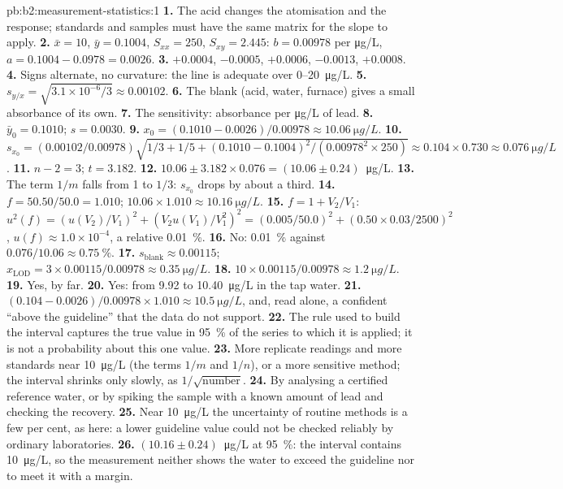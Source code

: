 \begin{solution}{pb:b2:measurement-statistics:1}
\textbf{1.} The acid changes the atomisation and the response; standards and samples must have the same
matrix for the slope to apply.
\textbf{2.} $\bar x = 10$, $\bar y = 0.1004$, $S_{xx} = 250$, $S_{xy} = 2.445$: $b = 0.00978$ per
\unit{\micro g/L}, $a = 0.1004 - 0.0978 = 0.0026$.
\textbf{3.} $+0.0004$, $-0.0005$, $+0.0006$, $-0.0013$, $+0.0008$.
\textbf{4.} Signs alternate, no curvature: the line is adequate over 0--\qty{20}{\micro g/L}.
\textbf{5.} $s_{y/x} = \sqrt{3.1 \times 10^{-6}/3} \approx 0.00102$.
\textbf{6.} The blank (acid, water, furnace) gives a small absorbance of its own.
\textbf{7.} The sensitivity: absorbance per \unit{\micro g/L} of lead.
\textbf{8.} $\bar y_0 = 0.1010$; $s = 0.0030$.
\textbf{9.} $x_0 = (0.1010 - 0.0026)/0.00978 \approx \qty{10.06}{\micro g/L}$.
\textbf{10.} $s_{x_0} = (0.00102/0.00978)\sqrt{1/3 + 1/5 + (0.1010 - 0.1004)^2/(0.00978^2 \times 250)}
\approx 0.104 \times 0.730 \approx \qty{0.076}{\micro g/L}$.
\textbf{11.} $n - 2 = 3$; $t = 3.182$.
\textbf{12.} $10.06 \pm 3.182 \times 0.076 = (10.06 \pm 0.24)$~\unit{\micro g/L}.
\textbf{13.} The term $1/m$ falls from 1 to $1/3$: $s_{x_0}$ drops by about a third.
\textbf{14.} $f = 50.50/50.0 = 1.010$; $10.06 \times 1.010 \approx \qty{10.16}{\micro g/L}$.
\textbf{15.} $f = 1 + V_2/V_1$: $u^2(f) = (u(V_2)/V_1)^2 + (V_2u(V_1)/V_1^2)^2 = (0.005/50.0)^2 +
(0.50 \times 0.03/2500)^2$, $u(f) \approx 1.0 \times 10^{-4}$, a relative 0.01~\%.
\textbf{16.} No: 0.01~\% against $0.076/10.06 \approx 0.75~\%$.
\textbf{17.} $s_{\mathrm{blank}} \approx 0.00115$; $x_{\mathrm{LOD}} = 3 \times 0.00115/0.00978 \approx
\qty{0.35}{\micro g/L}$.
\textbf{18.} $10 \times 0.00115/0.00978 \approx \qty{1.2}{\micro g/L}$.
\textbf{19.} Yes, by far.
\textbf{20.} Yes: from 9.92 to \qty{10.40}{\micro g/L} in the tap water.
\textbf{21.} $(0.104 - 0.0026)/0.00978 \times 1.010 \approx \qty{10.5}{\micro g/L}$, and, read alone,
a confident ``above the guideline'' that the data do not support.
\textbf{22.} The rule used to build the interval captures the true value in 95~\% of the series to
which it is applied; it is not a probability about this one value.
\textbf{23.} More replicate readings and more standards near \qty{10}{\micro g/L} (the terms $1/m$ and
$1/n$), or a more sensitive method; the interval shrinks only slowly, as $1/\sqrt{\text{number}}$.
\textbf{24.} By analysing a certified reference water, or by spiking the sample with a known amount of
lead and checking the recovery.
\textbf{25.} Near \qty{10}{\micro g/L} the uncertainty of routine methods is a few per cent, as here: a
lower guideline value could not be checked reliably by ordinary laboratories.
\textbf{26.} $\boldsymbol{(10.16 \pm 0.24)}$~\unit{\micro g/L} at 95~\%: the interval contains
\qty{10}{\micro g/L}, so the measurement neither shows the water to exceed the guideline nor to meet it
with a margin.
\end{solution}
